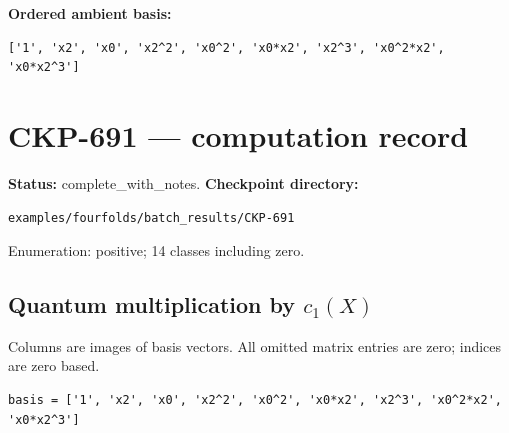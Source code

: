 \documentclass[10pt,a4paper]{article}
\begin{document}
\textbf{Ordered ambient basis:}
\begin{lstlisting}
['1', 'x2', 'x0', 'x2^2', 'x0^2', 'x0*x2', 'x2^3', 'x0^2*x2', 'x0*x2^3']
\end{lstlisting}

\clearpage\section*{CKP-691 --- computation record}
\textbf{Status:} complete\_with\_notes.
\textbf{Checkpoint directory:}
\begin{lstlisting}
examples/fourfolds/batch_results/CKP-691
\end{lstlisting}

Enumeration: positive; 14 classes including zero.
\subsection*{Quantum multiplication by $c_1(X)$}
Columns are images of basis vectors. All omitted matrix entries are zero; indices are zero based.

\begin{lstlisting}
basis = ['1', 'x2', 'x0', 'x2^2', 'x0^2', 'x0*x2', 'x2^3', 'x0^2*x2', 'x0*x2^3']
\end{lstlisting}
\end{document}
